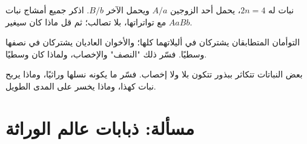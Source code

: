 \begin{exercise}[$\star\star\star$]\label{exo:g12:meiosis-genetic-shuffling:13}
نبات له $2n = 4$، يحمل أحد الزوجين $A/a$ ويحمل الآخر $B/b$. اذكر جميع
أمشاج نبات $AaBb$ مع تواتراتها، بلا تصالب؛ ثم قل ماذا كان 
سيغير.
\end{exercise}

\begin{exercise}[$\star\star\star$]\label{exo:g12:meiosis-genetic-shuffling:14}
التوأمان المتطابقان يشتركان في أليلاتهما كلها؛ والأخوان العاديان
يشتركان في نصفها وسطيًا. فسّر ذلك "النصف"  والإخصاب،
ولماذا كان وسطيًا.
\end{exercise}

\begin{exercise}[$\star\star\star$]\label{exo:g12:meiosis-genetic-shuffling:15}
بعض النباتات تتكاثر ببذور تتكون بلا  ولا إخصاب. فسّر ما
يكونه نسلها وراثيًا، وماذا يربح نبات كهذا، وماذا يخسر على المدى الطويل.
\end{exercise}

\section{مسألة: ذبابات عالم الوراثة}

